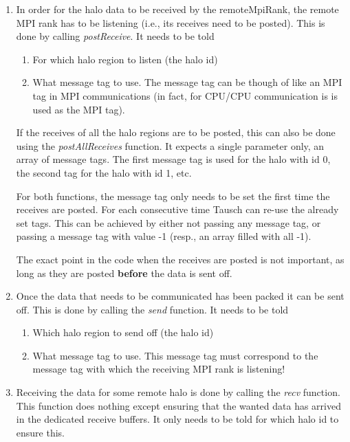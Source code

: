 \documentclass{article}
\begin{document}
\begin{enumerate}
    \item In order for the halo data to be received by the remoteMpiRank, the remote MPI rank has to be listening (i.e., its receives need to be posted). This is done by calling \emph{postReceive}. It needs to be told
    \begin{enumerate}
        \item For which halo region to listen (the halo id)
        \item What message tag to use. The message tag can be though of like an MPI tag in MPI communications (in fact, for CPU/CPU communication is is used as the MPI tag).
    \end{enumerate}
    If the receives of all the halo regions are to be posted, this can also be done using the \emph{postAllReceives} function. It expects a single parameter only, an array of message tags. The first message tag is used for the halo with id 0, the second tag for the halo with id 1, etc.

    For both functions, the message tag only needs to be set the first time the receives are posted. For each consecutive time Tausch can re-use the already set tags. This can be achieved by either not passing any message tag, or passing a message tag with value -1 (resp., an array filled with all -1).

    The exact point in the code when the receives are posted is not important, as long as they are posted \textbf{before} the data is sent off.

    \item Once the data that needs to be communicated has been packed it can be sent off. This is done by calling the \emph{send} function. It needs to be told
    \begin{enumerate}
        \item Which halo region to send off (the halo id)
        \item What message tag to use. This message tag must correspond to the message tag with which the receiving MPI rank is listening!
    \end{enumerate}

    \item Receiving the data for some remote halo is done by calling the \emph{recv} function. This function does nothing except ensuring that the wanted data has arrived in the dedicated receive buffers. It only needs to be told for which halo id to ensure this.


\end{enumerate}
\end{document}
